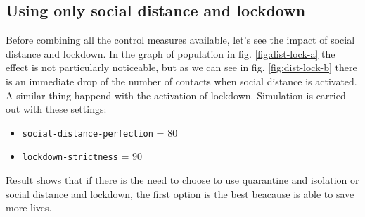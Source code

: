 \documentclass[12pt]{llncs}
\begin{document}
\subsection{Using only social distance and lockdown}
Before combining all the control measures available, let's see the impact of social distance and lockdown. In the graph of population in fig. \ref{fig:dist-lock-a} the effect is not particularly noticeable, but as we can see in fig. \ref{fig:dist-lock-b} there is an immediate drop of the number of contacts when social distance is activated. A similar thing happend with the activation of lockdown. Simulation is carried out with these settings:
\begin{itemize}
\item \texttt{social-distance-perfection} = 80
\item \texttt{lockdown-strictness} = 90
\end{itemize}

Result shows that if there is the need to choose to use quarantine and isolation or social distance and lockdown, the first option is the best beacause is able to save more lives.
\end{document}
